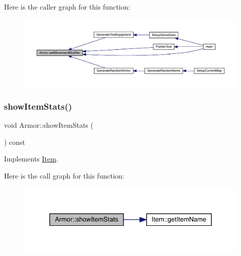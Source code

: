 Here is the caller graph for this function\+:
\nopagebreak
\begin{figure}[H]
\begin{center}
\leavevmode
\includegraphics[width=350pt]{class_armor_a99475fc688add41f89b7fef160534e33_icgraph}
\end{center}
\end{figure}
\mbox{\label{class_armor_a4fe1507d7aaf280a18e19f51a6f8c42d}} 
\subsubsection{\texorpdfstring{show\+Item\+Stats()}{showItemStats()}}
{\footnotesize\ttfamily void Armor\+::show\+Item\+Stats (\begin{DoxyParamCaption}{ }\end{DoxyParamCaption}) const\hspace{0.3cm}{\ttfamily [virtual]}}



Implements \mbox{\hyperlink{class_item_aaf7dae41afdce432c11261043e8e4e30}{Item}}.

Here is the call graph for this function\+:
\nopagebreak
\begin{figure}[H]
\begin{center}
\leavevmode
\includegraphics[width=331pt]{class_armor_a4fe1507d7aaf280a18e19f51a6f8c42d_cgraph}
\end{center}
\end{figure}
\mbox{\label{class_armor_a72b3d5c0294e80243ed8c96dbc35ccc7}} 

